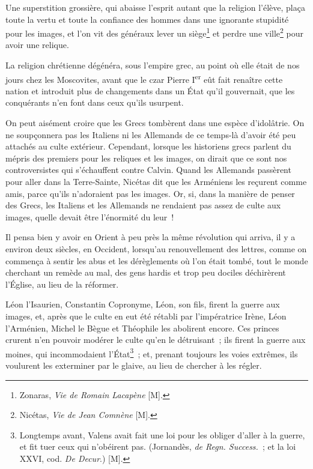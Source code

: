 \documentclass[french,twoside]{book} %
\begin{document}
Une superstition grossière, qui abaisse l’esprit autant que la religion l’élève, plaça toute la vertu et toute la confiance des hommes dans une ignorante stupidité pour les images, et l’on vit des généraux lever un siège\footnote{Zonaras, {\itshape Vie de Romain Lacapène} [M].} et perdre une ville\footnote{Nicétas, {\itshape Vie de Jean Comnène} [M].} pour avoir une relique.\par
La religion chrétienne dégénéra, sous l’empire grec, au point où elle était de nos jours chez les Moscovites, avant que le czar Pierre I\textsuperscript{er} eût fait renaître cette nation et introduit plus de changements dans un État qu’il gouvernait, que les conquérants n’en font dans ceux qu’ils usurpent.\par
On peut aisément croire que les Grecs tombèrent dans une espèce d’idolâtrie. On ne soupçonnera pas les Italiens ni les Allemands de ce temps-là d’avoir été peu attachés au culte extérieur. Cependant, lorsque les historiens grecs parlent du mépris des premiers pour les reliques et les images, on dirait que ce sont nos controversistes qui s’échauffent contre Calvin. Quand les Allemands passèrent pour aller dans la Terre-Sainte, Nicétas dit que les Arméniens les reçurent comme amis, parce qu’ils n’adoraient pas les images. Or, si, dans la manière de penser des Grecs, les Italiens et les Allemands ne rendaient pas assez de culte aux images, quelle devait être l’énormité du leur !\par
Il pensa bien y avoir en Orient à peu près la même révolution qui arriva, il y a environ deux siècles, en Occident, lorsqu’au renouvellement des lettres, comme on commença à sentir les abus et les dérèglements où l’on était tombé, tout le monde cherchant un remède au mal, des gens hardis et trop peu dociles déchirèrent l’Église, au lieu de la réformer.\par
Léon l’Isaurien, Constantin Copronyme, Léon, son fils, firent la guerre aux images, et, après que le culte en eut été rétabli par l’impératrice Irène, Léon l’Arménien, Michel le Bègue et Théophile les abolirent encore. Ces princes crurent n’en pouvoir modérer le culte qu’en le détruisant ; ils firent la guerre aux moines, qui incommodaient l’État\footnote{Longtemps avant, Valens avait fait une loi pour les obliger d’aller à la guerre, et fit tuer ceux qui n’obéirent pas. (Jornandès, {\itshape de Regn. Success.} ; et la loi XXVI, cod. {\itshape De Decur}.) [M].} ; et, prenant toujours les voies extrêmes, ils voulurent les exterminer par le glaive, au lieu de chercher à les régler.\par
\end{document}

